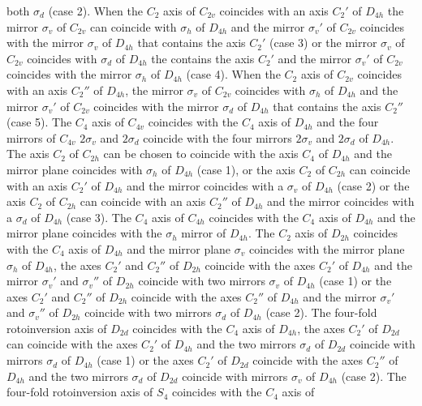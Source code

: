 \documentclass[12pt,a4paper]{article}
\begin{document}
both $\sigma_d$ (case 2). When the $C_2$ axis of $C_{2v}$ coincides with an axis 
$C_2'$ of $D_{4h}$ the mirror $\sigma_v$ of $C_{2v}$ can coincide with $\sigma_h$ of
$D_{4h}$ and the mirror $\sigma_v'$ of $C_{2v}$ coincides with the mirror
$\sigma_v$ of $D_{4h}$ that contains the axis $C_2'$ (case 3) or the mirror
$\sigma_v$ of $C_{2v}$ coincides with $\sigma_d$ of
$D_{4h}$ the contains the axis $C_2'$ and the mirror $\sigma_v'$ of $C_{2v}$ 
coincides with the mirror $\sigma_h$ of $D_{4h}$ (case 4). 
When the $C_2$ axis of $C_{2v}$ coincides with an axis $C_2''$
of $D_{4h}$, the mirror $\sigma_v$ of $C_{2v}$ coincides with $\sigma_h$ 
of $D_{4h}$ and the mirror $\sigma_v'$ of $C_{2v}$ coincides with the
mirror $\sigma_d$ of $D_{4h}$ that contains the axis $C_2''$ (case 5). 
The $C_4$ axis of $C_{4v}$ coincides with the $C_4$ axis of $D_{4h}$
and the four mirrors of $C_{4v}$ $2\sigma_v$ and $2\sigma_d$
coincide with the four mirrors $2\sigma_v$ and $2\sigma_d$ of $D_{4h}$. 
The axis $C_2$ of $C_{2h}$ can be chosen to coincide with the 
axis $C_4$ of $D_{4h}$ and the mirror plane coincides with
$\sigma_h$ of $D_{4h}$ (case 1), or the axis $C_2$ of $C_{2h}$ can
coincide with an axis $C_2'$ of $D_{4h}$ and the mirror coincides with a 
$\sigma_v$ of $D_{4h}$ (case 2) or the axis $C_2$ of $C_{2h}$ can 
coincide with an axis $C_2''$ of $D_{4h}$ and the mirror coincides with a 
$\sigma_d$ of $D_{4h}$ (case 3). 
The $C_4$ axis of $C_{4h}$ coincides with the $C_4$ axis of $D_{4h}$ and
the mirror plane coincides with the $\sigma_h$ mirror of $D_{4h}$. 
The $C_2$ axis of $D_{2h}$ coincides with the $C_4$ axis of $D_{4h}$
and the mirror plane $\sigma_v$ coincides with the mirror plane $\sigma_h$
of $D_{4h}$, the axes $C_2'$ and $C_2''$ of $D_{2h}$ coincide with the 
axes $C_2'$ of $D_{4h}$ and the mirror $\sigma_v'$ and $\sigma_v''$ of $D_{2h}$
coincide with two mirrors $\sigma_v$ of $D_{4h}$ (case 1) or 
the axes $C_2'$ and $C_2''$ of $D_{2h}$ coincide with the axes $C_2''$ of
$D_{4h}$ and the mirror $\sigma_v'$ and $\sigma_v''$ of $D_{2h}$ 
coincide with two mirrors $\sigma_d$ of $D_{4h}$ (case 2).
The four-fold rotoinversion axis of $D_{2d}$ coincides with the $C_4$ axis of 
$D_{4h}$, the axes $C_2'$ of $D_{2d}$ can coincide with the 
axes $C_2'$ of $D_{4h}$ and the two mirrors $\sigma_d$ of $D_{2d}$
coincide with mirrors $\sigma_d$ of $D_{4h}$ (case 1) or 
the axes $C_2'$ of $D_{2d}$ coincide with the axes $C_2''$ of
$D_{4h}$ and the two mirrors $\sigma_d$ of $D_{2d}$ 
coincide with mirrors $\sigma_v$ of $D_{4h}$ (case 2).
The four-fold rotoinversion axis of $S_4$ coincides with the $C_4$ axis of 
\end{document}

